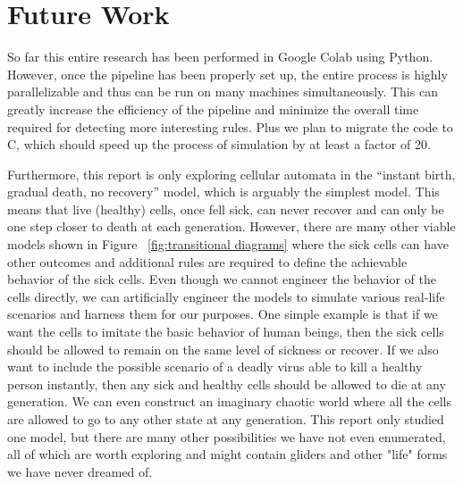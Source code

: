 \documentclass[12pt]{article}
\numberwithin{figure}{section} %
\begin{document}
\newpage
\section{Future Work}
\label{Future Work}
So far this entire research has been performed in Google Colab using Python. However, once the pipeline has been properly set up, the entire process is highly parallelizable and thus can be run on many machines simultaneously. This can greatly increase the efficiency of the pipeline and minimize the overall time required for detecting more interesting rules. Plus we plan to migrate the code to C, which should speed up the process of simulation by at least a factor of 20. 

Furthermore, this report is only exploring cellular automata in the “instant birth, gradual death, no recovery” model, which is arguably the simplest model. This means that live (healthy) cells, once fell sick, can never recover and can only be one step closer to death at each generation. However, there are many other viable models shown in Figure ~\ref{fig:transitional diagrams} where the sick cells can have other outcomes and additional rules are required to define the achievable behavior of the sick cells. Even though we cannot engineer the behavior of the cells directly, we can artificially engineer the models to simulate various real-life scenarios and harness them for our purposes. One simple example is that if we want the cells to imitate the basic behavior of human beings, then the sick cells should be allowed to remain on the same level of sickness or recover. If we also want to include the possible scenario of a deadly virus able to kill a healthy person instantly, then any sick and healthy cells should be allowed to die at any generation. We can even construct an imaginary chaotic world where all the cells are allowed to go to any other state at any generation. This report only studied one model, but there are many other possibilities we have not even enumerated, all of which are worth exploring and might contain gliders and other "life" forms we have never dreamed of. 
\end{document}

